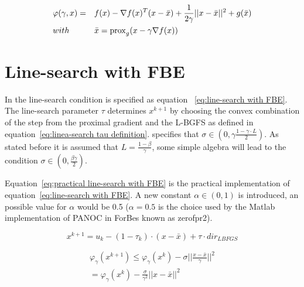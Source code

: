 %		
		\begin{equation}
			\begin{aligned}	
				& \varphi(\gamma,x)= 
				&& f(x) - \nabla f(x)^T(x-\bar{x}) + \frac{1}{2 \gamma}||x-\bar{x}||^2  + g(\bar{x})
				\\
				& with 
				&&\bar{x} = \operatorname{prox}_g( x - \gamma\nabla f(x)) 
			\end{aligned} 
			\label{eq:practical implementation of FBE}
		\end{equation}
		
	
	\section{Line-search with FBE}
	In \cite{LorenzoStella2017} the line-search condition is specified as equation ~\ref{eq:line-search with FBE}. The line-search parameter $\tau$ determines $x^{k+1}$ by choosing the convex combination of the step from the proximal gradient and the L-BGFS as defined in equation~\ref{eq:linea-search tau definition}.  \cite{LorenzoStella2017} specifies that $\sigma \in (0, \gamma \frac{1-\gamma\cdot L}{2})$. As stated before it is assumed that $L=\frac{1-\beta}{\gamma}$, some simple algebra will lead to the condition $\sigma \in (0,\frac{\beta \gamma}{2})$.
	
	 Equation~\ref{eq:practical line-search with FBE} is the practical implementation of equation~\ref{eq:line-search with FBE}. A new constant $\alpha \in (0,1)$ is introduced, an possible value for $\alpha$ would be 0.5 ($\alpha=0.5$ is the choice used by the Matlab implementation of PANOC in ForBes known as zerofpr2).
	
	\begin{equation}
		x^{k+1} = u_k - (1-\tau_k)\cdot (x-\bar{x}) + \tau \cdot dir_{LBFGS}
		\label{eq:linea-search tau definition}
	\end{equation}
	
	\begin{eqnarray}
		\label{eq:line-search with FBE}
		\varphi_{\gamma}(x^{k+1})\leq\varphi_{\gamma}(x^{k}) - \sigma ||\frac{x-\bar{x}}{\gamma}||^2 \\
		=
		\varphi_{\gamma}(x^{k}) - \frac{\sigma}{\gamma^2} ||x-\bar{x}||^2
	\end{eqnarray}
	
